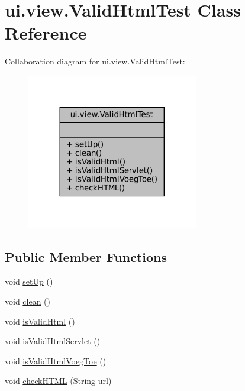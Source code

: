 \hypertarget{classui_1_1view_1_1ValidHtmlTest}{}\section{ui.\+view.\+Valid\+Html\+Test Class Reference}
\label{classui_1_1view_1_1ValidHtmlTest}


Collaboration diagram for ui.\+view.\+Valid\+Html\+Test\+:
\nopagebreak
\begin{figure}[H]
\begin{center}
\leavevmode
\includegraphics[width=212pt]{classui_1_1view_1_1ValidHtmlTest__coll__graph}
\end{center}
\end{figure}
\subsection*{Public Member Functions}
\begin{DoxyCompactItemize}
\item 
void \mbox{\hyperlink{classui_1_1view_1_1ValidHtmlTest_ab8b8fceee9bd04cfaa8e36ab20a1b187}{set\+Up}} ()
\item 
void \mbox{\hyperlink{classui_1_1view_1_1ValidHtmlTest_a9a983824165e79b0d49b926f8e8bb93d}{clean}} ()
\item 
void \mbox{\hyperlink{classui_1_1view_1_1ValidHtmlTest_acc26eb45177c0e91e6cf5a9ce5cd87c6}{is\+Valid\+Html}} ()
\item 
void \mbox{\hyperlink{classui_1_1view_1_1ValidHtmlTest_abe0e61f178a5149b5e6f164e2aca0954}{is\+Valid\+Html\+Servlet}} ()
\item 
void \mbox{\hyperlink{classui_1_1view_1_1ValidHtmlTest_ad7668206a00948b1f12bfe563a1c5ebe}{is\+Valid\+Html\+Voeg\+Toe}} ()
\item 
void \mbox{\hyperlink{classui_1_1view_1_1ValidHtmlTest_a959aa0cb6d44bfd2c7daa4387f6a1023}{check\+H\+T\+ML}} (String url)
\end{DoxyCompactItemize}



